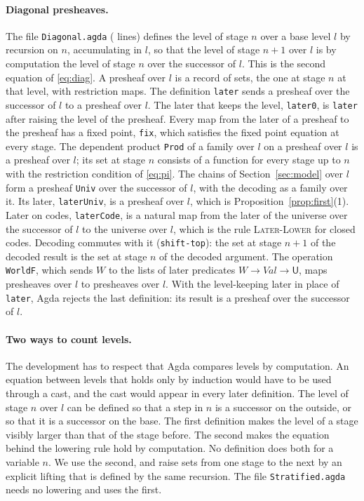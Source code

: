 \documentclass[acmsmall,nonacm,screen]{acmart}
\newcommand{\Uv}{\mathsf{U}}
\newcommand{\agda}[1]{\texttt{#1}}
\newcommand{\Val}{\mathit{Val}}
\newcommand{\Wld}{W}
\newcommand{\claim}[2]{#2}
\begin{document}
\paragraph{Diagonal presheaves.}
The file \agda{Diagonal.agda} (\LinesDiagonal{} lines) defines the level of stage $n$ over a
base level $l$ by recursion on $n$, accumulating in $l$, so that the level of stage $n+1$
over $l$ is by computation the level of stage $n$ over the successor of $l$. This is the
second equation of \eqref{eq:diag}. A presheaf over $l$ is a record of sets, the one at
stage $n$ at that level, with restriction maps.
\claim{lowering}{The definition \agda{later} sends a presheaf over the successor of $l$ to a
presheaf over $l$.}
\claim{usual-later}{The later that keeps the level, \agda{later0}, is \agda{later} after
raising the level of the presheaf.}
\claim{fixed-points}{Every map from the later of a presheaf to the presheaf has a fixed point,
\agda{fix}, which satisfies the fixed point equation at every stage.}
\claim{products}{The dependent product \agda{Prod} of a family over $l$ on a presheaf over
$l$ is a presheaf over $l$; its set at stage $n$ consists of a function for every stage up
to $n$ with the restriction condition of \eqref{eq:pi}.}
\claim{universe}{The chains of Section~\ref{sec:model} over $l$ form a presheaf \agda{Univ} over
the successor of $l$, with the decoding as a family over it.}
\claim{later-universe}{Its later, \agda{laterUniv}, is a presheaf over $l$, which is
Proposition~\ref{prop:first}(1).}
\claim{codes}{Later on codes, \agda{laterCode}, is a natural map from the later of the universe
over the successor of $l$ to the universe over $l$, which is the rule
\textsc{Later-Lower} for closed codes.}
\claim{decoding}{Decoding commutes with it (\agda{shift-top}): the set at stage $n+1$ of the
decoded result is the set at stage $n$ of the decoded argument.}
\claim{worlds}{The operation \agda{WorldF}, which sends $\Wld$ to the lists of later
predicates $\Wld \to \Val \to \Uv$, maps presheaves over $l$ to presheaves over $l$.}
\claim{keep-rejected}{With the level-keeping later in place of \agda{later}, Agda rejects the
last definition: its result is a presheaf over the successor of $l$.}

\paragraph{Two ways to count levels.}
The development has to respect that Agda compares levels by computation. An equation between
levels that holds only by induction would have to be used through a cast, and the cast
would appear in every later definition. The level of
stage $n$ over $l$ can be defined so that a step in $n$ is a successor on the outside, or so
that it is a successor on the base. The first definition makes the level of a stage
visibly larger than that of the stage before. The second makes the equation behind the
lowering rule hold by computation. No definition does both for a variable $n$. We use the
second, and raise sets from one stage to the next by an explicit lifting that is defined by
the same recursion. The file \agda{Stratified.agda} needs no lowering and uses the first.
\end{document}

